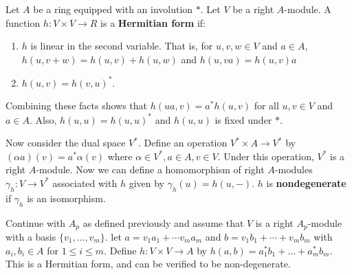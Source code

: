 \documentclass[11pt]{article}
\begin{document}
\begin{definition*}
Let $A$ be a ring equipped with an involution $*$.
Let $V$ be a right $A$-module. 
A function $h: V \times V \to R$ is a \textbf{Hermitian form} if:
\begin{enumerate}
\item $h$ is linear in the second variable.
That is, for $u, v, w \in V$ and $a \in A$, $h(u, v + w) = h(u, v) + h(u, w)$ and $h(u, va) = h(u, v)a$
\item $h(u,v) = h(v, u)^*$.
\end{enumerate}
Combining these facts shows that $h(ua, v) = a^* h(u, v)$ for all $u, v \in V$ and $a \in A$.
Also, $h(u,u) = h(u,u)^*$ and $h(u,u)$ is fixed under $*$.

Now consider the dual space $V^*$. Define an operation $V^* \times A \to V^*$ by $(\alpha a)(v) = a^* \alpha(v)$ where $\alpha \in V^*, a \in A, v \in V$.
Under this operation, $V^*$ is a right $A$-module.
Now we can define a homomorphism of right $A$-modules $\gamma_h: V \to V^*$ associated with $h$ given by $\gamma_h(u) = h(u, -)$.
$h$ is \textbf{nondegenerate} if $\gamma_h$ is an isomorphism.
\end{definition*}
\begin{example*}
Continue with $A_p$ as defined previously and assume that $V$ is a right $A_p$-module with a basis $\{v_1, \dotsc, v_m\}$.
let $a = v_1 a_1 + \dotsb v_m a_m$ and $b = v_1 b_1 + \dotsb + v_m b_m$ with $a_i, b_i \in A$ for $1 \le i \le m$.
Define $h: V \times V \to A$ by $h(a, b) = a_1^* b_1 + \dotsc + a_m^* b_m$.
This is a Hermitian form, and can be verified to be non-degenerate.
\end{example*}

\newpage
\end{document}
